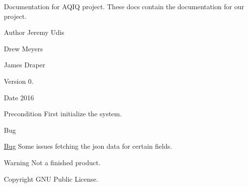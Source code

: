 Documentation for A\+Q\+IQ project. These docs contain the documentation for our project. \begin{DoxyAuthor}{Author}
Jeremy Udis 

Drew Meyers 

James Draper 
\end{DoxyAuthor}
\begin{DoxyVersion}{Version}
0. 
\end{DoxyVersion}
\begin{DoxyDate}{Date}
2016 
\end{DoxyDate}
\begin{DoxyPrecond}{Precondition}
First initialize the system. 
\end{DoxyPrecond}
\begin{DoxyRefDesc}{Bug}
\item[\hyperlink{bug__bug000001}{Bug}]Some issues fetching the json data for certain fields. \end{DoxyRefDesc}
\begin{DoxyWarning}{Warning}
Not a finished product. 
\end{DoxyWarning}
\begin{DoxyCopyright}{Copyright}
G\+NU Public License. 
\end{DoxyCopyright}
